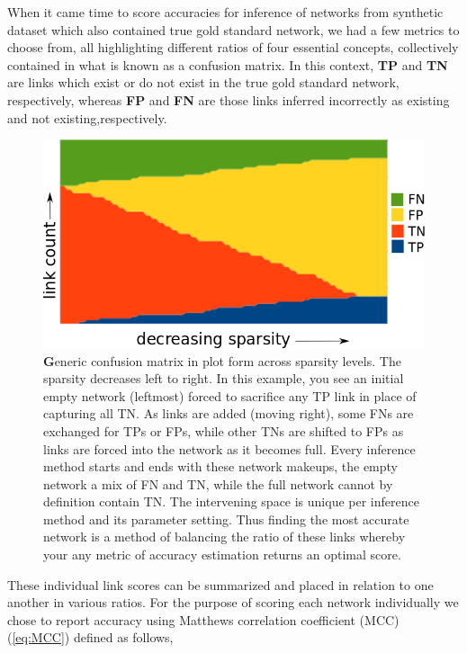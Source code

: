 When it came time to score accuracies for inference of networks from synthetic dataset which also contained true gold standard network, we had a few metrics to choose from, all highlighting different ratios of four essential concepts, collectively contained in what is known as a confusion matrix. In this context, \textbf{TP} and \textbf{TN} are links which exist or do not exist in the true gold standard network, respectively, whereas \textbf{FP} and \textbf{FN} are those links inferred incorrectly as existing and not existing,respectively.

\begin{figure}
\centering
\includegraphics[width=1\linewidth]{4/confusionMatrix_sparsity.png}
\caption{{\textbf Generic confusion matrix in plot form across sparsity levels.} The sparsity decreases left to right. In this example, you see an initial empty network (leftmost) forced to sacrifice any TP link in place of capturing all TN. As links are added (moving right), some FNs are exchanged for TPs or FPs, while other TNs are shifted to FPs as links are forced into the network as it becomes full. Every inference method starts and ends with these network makeups, the empty network a mix of FN and TN, while the full network cannot by definition contain TN. The intervening space is unique per inference method and its parameter setting. Thus finding the most accurate network is a method of balancing the ratio of these links whereby your any metric of accuracy estimation returns an optimal score.}
\label{fig:confusion}
\end{figure}

These individual link scores can be summarized and placed in relation to one another in various ratios. For the purpose of scoring each network individually we chose to report accuracy using Matthews correlation coefficient (MCC) (\cref{eq:MCC}) defined as follows,


